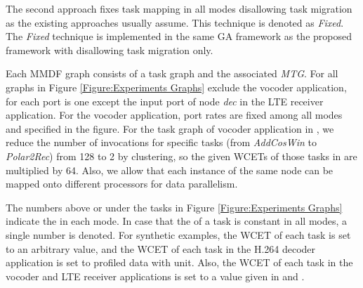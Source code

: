 \documentclass[prodmode,acmtecs]{acmsmall}
\begin{document}
The second approach fixes task mapping in all modes disallowing task migration as the existing approaches usually assume. This technique is denoted as \textit{Fixed}. The \textit{Fixed} technique is implemented in the same GA framework as the proposed framework with disallowing task migration only.

Each MMDF graph consists of a task graph and the associated \textit{MTG}. For all graphs in Figure \ref{Figure:Experiments Graphs} exclude the vocoder application,  for each port  is one except the input port of node \textit{dec} in the LTE receiver application. For the vocoder application, port rates are fixed among all modes and specified in the figure. For the task graph of vocoder application in \cite{Zhai:2015}, we reduce the number of invocations for specific tasks (from \textit{AddCosWin} to \textit{Polar2Rec}) from 128 to 2 by clustering, so the given WCETs of those tasks in \cite{Zhai:2015} are multiplied by 64. Also, we allow that each instance of the same node can be mapped onto different processors for data parallelism.

The numbers above or under the tasks in Figure \ref{Figure:Experiments Graphs} indicate the  in each mode. In case that the  of a task is constant in all modes, a single number is denoted. For synthetic examples, the WCET of each task is set to an arbitrary value, and the WCET of each task in the H.264 decoder application is set to profiled data with  unit. Also, the WCET of each task in the vocoder and LTE receiver applications is set to a value given in \cite{Zhai:2015} and \cite{Siyoum:2011}.

\begin{table}[ht]
\centering
{}
\end{table}
\end{document}
